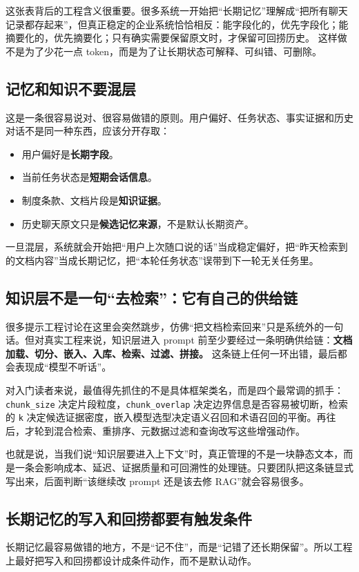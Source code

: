 这张表背后的工程含义很重要。很多系统一开始把“长期记忆”理解成“把所有聊天记录都存起来”，但真正稳定的企业系统恰恰相反：{\heiti 能字段化的，优先字段化；能摘要化的，优先摘要化；只有确实需要保留原文时，才保留可回捞历史。} 这样做不是为了少花一点 token，而是为了让长期状态可解释、可纠错、可删除。

\subsection{记忆和知识不要混层}
这是一条很容易说对、很容易做错的原则。用户偏好、任务状态、事实证据和历史对话不是同一种东西，应该分开存取：
\begin{itemize}
  \item 用户偏好是\textbf{长期字段}。
  \item 当前任务状态是\textbf{短期会话信息}。
  \item 制度条款、文档片段是\textbf{知识证据}。
  \item 历史聊天原文只是\textbf{候选记忆来源}，不是默认长期资产。
\end{itemize}

一旦混层，系统就会开始把“用户上次随口说的话”当成稳定偏好，把“昨天检索到的文档内容”当成长期记忆，把“本轮任务状态”误带到下一轮无关任务里。

\subsection{知识层不是一句“去检索”：它有自己的供给链}
很多提示工程讨论在这里会突然跳步，仿佛“把文档检索回来”只是系统外的一句话。但对真实工程来说，知识层进入 prompt 前至少要经过一条明确供给链：\textbf{文档加载、切分、嵌入、入库、检索、过滤、拼接。} 这条链上任何一环出错，最后都会表现成“模型不听话”。

对入门读者来说，最值得先抓住的不是具体框架类名，而是四个最常调的抓手：\texttt{chunk\_size} 决定片段粒度，\texttt{chunk\_overlap} 决定边界信息是否容易被切断，检索的 \texttt{k} 决定候选证据密度，嵌入模型选型决定语义召回和术语召回的平衡。再往后，才轮到混合检索、重排序、元数据过滤和查询改写这些增强动作。

也就是说，当我们说“知识层要进入上下文”时，真正管理的不是一块静态文本，而是一条会影响成本、延迟、证据质量和可回溯性的处理链。只要团队把这条链显式写出来，后面判断“该继续改 prompt 还是该去修 RAG”就会容易很多。

\subsection{长期记忆的写入和回捞都要有触发条件}
长期记忆最容易做错的地方，不是“记不住”，而是“记错了还长期保留”。所以工程上最好把写入和回捞都设计成条件动作，而不是默认动作。

